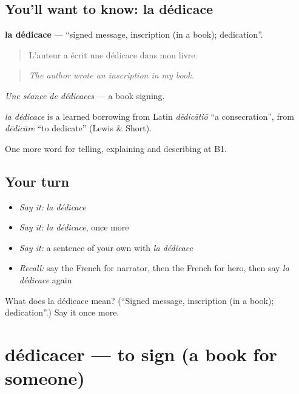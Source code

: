 \subsection*{You'll want to know: la dédicace}
\textbf{la dédicace} — \textquotedblleft{}signed message, inscription (in a book); dedication\textquotedblright{}.

\begin{quote}
L'auteur a écrit une dédicace dans mon livre.
\end{quote}

\begin{quote}
\emph{The author wrote an inscription in my book.}
\end{quote}

\emph{Une séance de dédicaces} — a book signing.

\begin{cousinweb}
\emph{la dédicace} is a learned borrowing from Latin \emph{dēdicātiō} \textquotedblleft{}a consecration\textquotedblright{}, from \emph{dēdicāre} \textquotedblleft{}to dedicate\textquotedblright{} (Lewis \& Short).
\end{cousinweb}

\begin{grammarlens}[title={What you've built}]
One more word for telling, explaining and describing at B1.
\end{grammarlens}

\subsection*{Your turn}
\begin{itemize}
\raggedright
  \item \emph{Say it:} \emph{la dédicace}
  \item \emph{Say it:} \emph{la dédicace}, once more
  \item \emph{Say it:} a sentence of your own with \emph{la dédicace}
  \item \emph{Recall:} say the French for narrator, then the French for hero, then say \emph{la dédicace} again
\end{itemize}

\begin{tcolorbox}[breakable,colback=teal!4,colframe=teal!35!black,title={Before you move on}]
What does la dédicace mean? (\textquotedblleft{}Signed message, inscription (in a book); dedication\textquotedblright{}.) Say it once more.
\end{tcolorbox}
\section[dédicacer]{dédicacer — to sign (a book for someone)}

